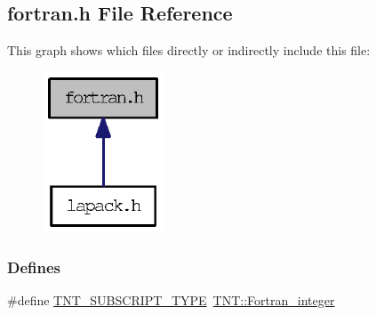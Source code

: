 \subsection{fortran.h File Reference}
\label{fortran_8h}
This graph shows which files directly or indirectly include this file:
\nopagebreak
\begin{figure}[H]
\begin{center}
\leavevmode
\includegraphics[width=102pt]{fortran_8h__dep__incl}
\end{center}
\end{figure}
\subsubsection*{Defines}
\begin{DoxyCompactItemize}
\item 
\#define \hyperlink{fortran_8h_ae204fca2c823f77ee865da86d3bf53d0}{TNT\_\-SUBSCRIPT\_\-TYPE}~\hyperlink{fortran_8h_a15b7ce181271097cf077da8f76060542}{TNT::Fortran\_\-integer}
\end{DoxyCompactItemize}
